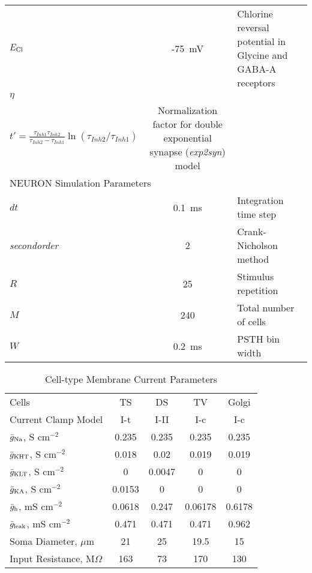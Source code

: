 \begin{table}[pt]
\begin{tabularx}{\linewidth}{XcX}
        $E_{{\rm Cl}}$          &         -75~mV          & Chlorine reversal potential in Glycine   and GABA-A receptors \\ %
           $\eta $           & \begin{minipage}[c]{2in}\begin{center}
 $\eta = \frac{1}{-\exp(t'/\tau_{Inh1})+\exp(t'/\tau_{inh2})}$ \\
 $t'=\frac{\tau_{Inh1}\tau_{Inh2}}{\tau_{Inh2}-\tau_{Inh1}}
 \ln(\tau_{Inh2}/\tau_{Inh1})$
 \end{center}   \end{minipage}                         & Normalization factor for  double exponential synapse (\textit{exp2syn}) model \cite{HinesCarnevale:2000} \\ \midrule
\multicolumn{2}{l}{NEURON Simulation Parameters} & \\ %
        $dt$         &          0.1~ms           & Integration time step \\ %
\textit{secondorder} &             2             & Crank-Nicholson method \\ %
        $R$          &            25             & Stimulus repetition \\ %
        $M$          &            240            & Total number of cells \\ %
        $W$          &          0.2~ms           & PSTH bin width \\
\bottomrule
\end{tabularx}
\end{table}

\begin{table}[tp]
  \centering
  \caption{Cell-type Membrane Current Parameters}\label{tab:GA:CellTypes}
  \begin{tabularx}{0.8\linewidth}{lcccc}\hline
                Cells                 &   TS   &   DS   &   TV    & Golgi \\ %
         Current Clamp Model          &  I-t   &  I-II  &   I-c   & I-c \\[0.5ex] \hline
 $\bar{g}_{{\rm Na}} $, S cm$^{-2}$   & 0.235  & 0.235  &  0.235  & 0.235 \\ %
 $\bar{g}_{{\rm KHT}} $, S cm$^{-2}$  & 0.018  &  0.02  &  0.019  & 0.019 \\ %
$\bar{g}_{{\rm  KLT}} $, S cm$^{-2}$  &   0    & 0.0047 &    0    & 0 \\ %
 $\bar{g}_{{\rm KA}} $, S cm$^{-2}$   & 0.0153 &   0    &    0    & 0 \\ %
 $\bar{g}_{{\rm h}} $, mS cm$^{-2}$   & 0.0618 & 0.247  & 0.06178 & 0.6178 \\ %
$\bar{g}_{{\rm leak}} $, mS cm$^{-2}$ & 0.471  & 0.471  &  0.471  & 0.962 \\ %
        Soma Diameter, $\mu$m         &   21   &   25   &  19.5   & 15 \\ %
    Input Resistance, M$\Omega $      &  163   &   73   &   170   & 130 \\ \hline
\end{tabularx}
\end{table}

